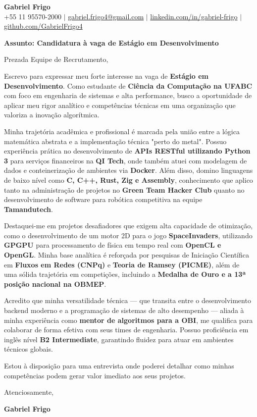 \documentclass[letterpaper,10pt]{article}
\begin{document}
\begin{center}
    \textbf{\Huge Gabriel Frigo} \\ \vspace{5pt}
    \small +55 11 95570-2000 $|$ 
    \href{mailto:gabriel.frigo4@gmail.com}{gabriel.frigo4@gmail.com} $|$ 
    \href{https://www.linkedin.com/in/gabriel-frigo-b6727b275/}{linkedin.com/in/gabriel-frigo} $|$ 
    \href{https://github.com/GabrielFrigo4}{github.com/GabrielFrigo4}
\end{center}

\vspace{10pt}

\textbf{Assunto: Candidatura à vaga de Estágio em Desenvolvimento}

Prezada Equipe de Recrutamento,

Escrevo para expressar meu forte interesse na vaga de \textbf{Estágio em Desenvolvimento}. Como estudante de \textbf{Ciência da Computação na UFABC} com foco em engenharia de sistemas e alta performance, busco a oportunidade de aplicar meu rigor analítico e competências técnicas em uma organização que valoriza a inovação algorítmica.

Minha trajetória acadêmica e profissional é marcada pela união entre a lógica matemática abstrata e a implementação técnica "perto do metal". Possuo experiência prática no desenvolvimento de \textbf{APIs RESTful utilizando Python 3} para serviços financeiros na \textbf{QI Tech}, onde também atuei com modelagem de dados e conteinerização de ambientes via \textbf{Docker}. Além disso, domino linguagens de baixo nível como \textbf{C, C++, Rust, Zig e Assembly}, conhecimento que aplico tanto na administração de projetos no \textbf{Green Team Hacker Club} quanto no desenvolvimento de software para robótica competitiva na equipe \textbf{Tamandutech}.

Destaquei-me em projetos desafiadores que exigem alta capacidade de otimização, como o desenvolvimento de um motor 2D para o jogo \textbf{SpaceInvaders}, utilizando \textbf{GPGPU} para processamento de física em tempo real com \textbf{OpenCL e OpenGL}. Minha base analítica é reforçada por pesquisas de Iniciação Científica em \textbf{Fluxos em Redes (CNPq)} e \textbf{Teoria de Ramsey (PICME)}, além de uma sólida trajetória em competições, incluindo a \textbf{Medalha de Ouro e a 13ª posição nacional na OBMEP}.

Acredito que minha versatilidade técnica — que transita entre o desenvolvimento backend moderno e a programação de sistemas de alto desempenho — aliada à minha experiência como \textbf{mentor de algoritmos para a OBI}, me qualifica para colaborar de forma efetiva com seus times de engenharia. Possuo proficiência em inglês nível \textbf{B2 Intermediate}, garantindo fluidez para atuar em ambientes técnicos globais.

Estou à disposição para uma entrevista onde poderei detalhar como minhas competências podem gerar valor imediato aos seus projetos.

Atenciosamente,

\textbf{Gabriel Frigo}
\end{document}
